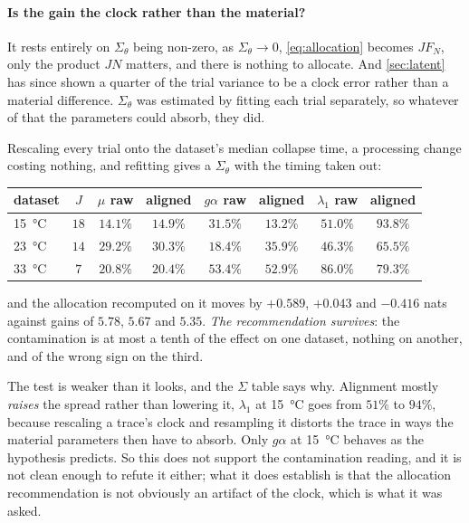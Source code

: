 \documentclass[10pt]{article}
\begin{document}
\paragraph{Is the gain the clock rather than the material?} It rests entirely on
$\Sigma_\theta$ being non-zero, as $\Sigma_\theta \to 0$, \eqref{eq:allocation} becomes
$JF_N$, only the product $JN$ matters, and there is nothing to allocate. And \cref{sec:latent}
has since shown a quarter of the trial variance to be a clock error rather than a material
difference. $\Sigma_\theta$ was estimated by fitting each trial separately, so whatever of that
the parameters could absorb, they did.

Rescaling every trial onto the dataset's median collapse time, a processing change costing
nothing, and refitting gives a $\Sigma_\theta$ with the timing taken out:

\begin{center}
\begin{tabular}{lccccccc}
\toprule
dataset & $J$ & $\mu$ raw & aligned & $g\alpha$ raw & aligned & $\lambda_1$ raw & aligned \\
\midrule
\SI{15}{\celsius} & $18$ & $14.1\%$ & $14.9\%$ & $31.5\%$ & $\mathbf{13.2\%}$ & $51.0\%$ & $93.8\%$ \\
\SI{23}{\celsius} & $14$ & $29.2\%$ & $30.3\%$ & $18.4\%$ & $35.9\%$ & $46.3\%$ & $65.5\%$ \\
\SI{33}{\celsius} & $7$ & $20.8\%$ & $20.4\%$ & $53.4\%$ & $52.9\%$ & $86.0\%$ & $79.3\%$ \\
\bottomrule
\end{tabular}
\end{center}

\noindent and the allocation recomputed on it moves by $+0.589$, $+0.043$ and $-0.416$ nats
against gains of $5.78$, $5.67$ and $5.35$. \emph{The recommendation survives}: the
contamination is at most a tenth of the effect on one dataset, nothing on another, and of the
wrong sign on the third.

The test is weaker than it looks, and the $\Sigma$ table says why. Alignment mostly \emph{raises}
the spread rather than lowering it, $\lambda_1$ at \SI{15}{\celsius} goes from $51\%$ to
$94\%$, because rescaling a trace's clock and resampling it distorts the trace in ways the
material parameters then have to absorb. Only $g\alpha$ at \SI{15}{\celsius} behaves as the
hypothesis predicts. So this does not support the contamination reading, and it is not clean
enough to refute it either; what it does establish is that the allocation recommendation is not
obviously an artifact of the clock, which is what it was asked.
\end{document}
